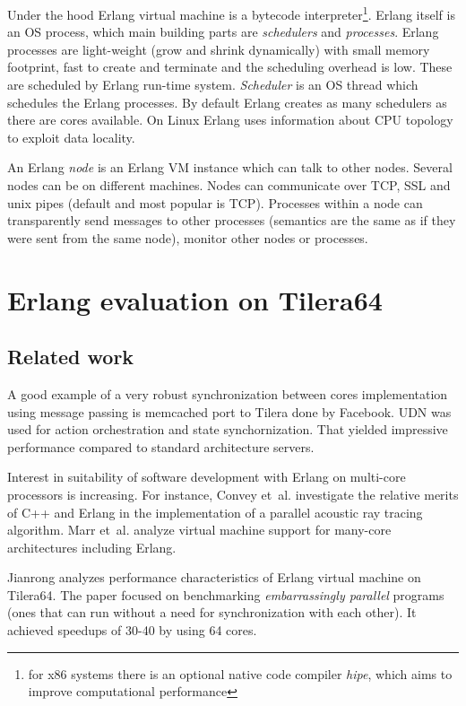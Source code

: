 \documentclass[english,11pt]{l4proj}
\begin{document}
Under the hood Erlang virtual machine is a bytecode interpreter\footnote{for x86
systems there is an optional native code compiler \emph{hipe}\cite{hipe}, which
aims to improve computational performance}. Erlang itself is an OS process,
which main building parts are {\em schedulers} and {\em processes}. Erlang
processes are light-weight (grow and shrink dynamically) with small memory
footprint, fast to create and terminate and the scheduling overhead is low.
These are scheduled by Erlang run-time system. {\em Scheduler} is an OS thread
which schedules the Erlang processes. By default Erlang creates as many
schedulers as there are cores available. On Linux Erlang uses information about
CPU topology to exploit data locality.

An Erlang {\em node} is an Erlang VM instance which can talk to other nodes.
Several nodes can be on different machines. Nodes can communicate over TCP, SSL
and unix pipes (default and most popular is TCP). Processes within a node can
transparently send messages to other processes (semantics are the same as if
they were sent from the same node), monitor other nodes or processes.

\section{Erlang evaluation on Tilera64}
\label{sec:erlang-eval}

\subsection{Related work}

A good example of a very robust synchronization between cores implementation
using message passing is memcached port to Tilera done by Facebook. UDN was used
for action orchestration and state synchornization\cite{facebook-tilera}. That
yielded impressive performance compared to standard architecture servers.

Interest in suitability of software development with Erlang on multi-core
processors is increasing. For instance, Convey et~al.\cite{erlang-acoustic}
investigate the relative merits of C++ and Erlang in the implementation of a
parallel acoustic ray tracing algorithm. Marr et~al.\cite{vm-manycore} analyze
virtual machine support for many-core architectures including Erlang.

Jianrong \cite{erlang-manycore-scalability} analyzes performance characteristics
of Erlang virtual machine on Tilera64. The paper focused on benchmarking
\emph{embarrassingly parallel} programs (ones that can run without a need for
synchronization with each other). It achieved speedups of 30-40 by using 64
cores.
\end{document}
